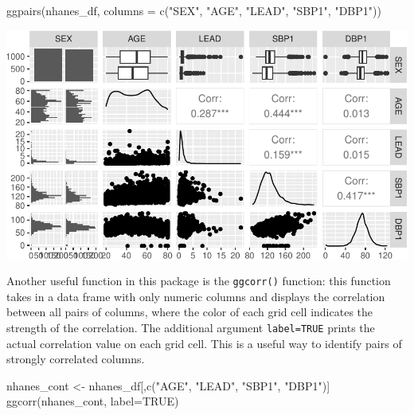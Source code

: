 \documentclass[
  letterpaper,
]{krantz}
\makeatletter
\newenvironment{Shaded}{\begin{snugshade}}{\end{snugshade}}
\newcommand{\AttributeTok}[1]{\textcolor[rgb]{0.40,0.45,0.13}{#1}}
\newcommand{\ConstantTok}[1]{\textcolor[rgb]{0.56,0.35,0.01}{#1}}
\newcommand{\FunctionTok}[1]{\textcolor[rgb]{0.28,0.35,0.67}{#1}}
\newcommand{\NormalTok}[1]{\textcolor[rgb]{0.00,0.23,0.31}{#1}}
\newcommand{\OtherTok}[1]{\textcolor[rgb]{0.00,0.23,0.31}{#1}}
\newcommand{\StringTok}[1]{\textcolor[rgb]{0.13,0.47,0.30}{#1}}
\newenvironment{kframe}{%
\medskip{}
\setlength{\fboxsep}{.8em}
 \def\at@end@of@kframe{}%
 \ifinner\ifhmode%
  \def\at@end@of@kframe{\end{minipage}}%
  \begin{minipage}{\columnwidth}%
 \fi\fi%
 \def\FrameCommand##1{\hskip\@totalleftmargin \hskip-\fboxsep
 \colorbox{shadecolor}{##1}\hskip-\fboxsep
     \hskip-\linewidth \hskip-\@totalleftmargin \hskip\columnwidth}%
 \MakeFramed {\advance\hsize-\width
   \@totalleftmargin\z@ \linewidth\hsize
   \@setminipage}}%
 {\par\unskip\endMakeFramed%
 \at@end@of@kframe}
\renewenvironment{Shaded}{\begin{kframe}}{\end{kframe}}
\makeatother
\begin{document}
\begin{Shaded}
\begin{Highlighting}[]
\FunctionTok{ggpairs}\NormalTok{(nhanes\_df, }\AttributeTok{columns =} \FunctionTok{c}\NormalTok{(}\StringTok{"SEX"}\NormalTok{, }\StringTok{"AGE"}\NormalTok{, }\StringTok{"LEAD"}\NormalTok{, }\StringTok{"SBP1"}\NormalTok{, }\StringTok{"DBP1"}\NormalTok{))}
\end{Highlighting}
\end{Shaded}

\begin{center}
\includegraphics[width=1\textwidth,height=\textheight]{book/exploratory_analysis_files/figure-pdf/unnamed-chunk-23-1.pdf}
\end{center}

Another useful function in this package is the \texttt{ggcorr()}
function: this function takes in a data frame with only numeric columns
and displays the correlation between all pairs of columns, where the
color of each grid cell indicates the strength of the correlation. The
additional argument \texttt{label=TRUE} prints the actual correlation
value on each grid cell. This is a useful way to identify pairs of
strongly correlated columns.

\begin{Shaded}
\begin{Highlighting}[]
\NormalTok{nhanes\_cont }\OtherTok{\textless{}{-}}\NormalTok{ nhanes\_df[,}\FunctionTok{c}\NormalTok{(}\StringTok{"AGE"}\NormalTok{, }\StringTok{"LEAD"}\NormalTok{, }\StringTok{"SBP1"}\NormalTok{, }\StringTok{"DBP1"}\NormalTok{)]}
\FunctionTok{ggcorr}\NormalTok{(nhanes\_cont, }\AttributeTok{label=}\ConstantTok{TRUE}\NormalTok{)}
\end{Highlighting}
\end{Shaded}
\end{document}
